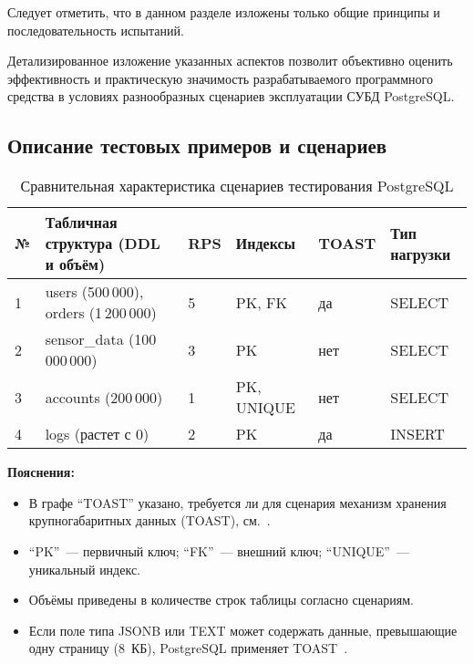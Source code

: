 Следует отметить, что в данном разделе изложены только общие принципы и последовательность испытаний. 

Детализированное изложение указанных аспектов позволит объективно оценить эффективность и практическую значимость 
разрабатываемого программного средства в условиях разнообразных сценариев эксплуатации СУБД PostgreSQL.

\subsection{Описание тестовых примеров и сценариев}

\begin{table}[htbp]
    \centering
    \captionsetup{justification=centering}
    \caption{Сравнительная характеристика сценариев тестирования PostgreSQL}
    \label{tab:scenarios_short}
    \begin{tabular}{|l|>{\raggedright}p{4.2cm}|l|l|l|l|}
        \hline
        № & Табличная структура (DDL и объём)    & RPS & Индексы & TOAST & Тип нагрузки \\
        \hline
        1 & users (500\,000), orders (1\,200\,000) & 5 & PK, FK & да & SELECT \\ \hline
        2 & sensor\_data (100\,000\,000) & 3 & PK & нет & SELECT \\ \hline
        3 & accounts (200\,000) & 1 & PK, UNIQUE & нет & SELECT \\ \hline
        4 & logs (растет с 0) & 2 & PK & да & INSERT \\ \hline
    \end{tabular}
    \vspace{0.5em}
\end{table}

\textbf{Пояснения:}
\begin{itemize}
    \item В графе ``TOAST'' указано, требуется ли для сценария механизм хранения крупногабаритных данных (TOAST), см.~\cite{postgres_toast}.
    \item ``PK''~--- первичный ключ; ``FK''~--- внешний ключ; ``UNIQUE''~--- уникальный индекс.
    \item Объёмы приведены в количестве строк таблицы согласно сценариям.
    \item Если поле типа JSONB или TEXT может содержать данные, превышающие одну страницу (8~КБ), PostgreSQL применяет TOAST~\cite{postgres-docs}.
\end{itemize}


